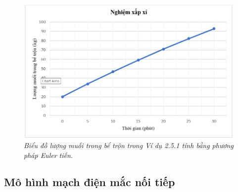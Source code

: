 \begin{figure}[H]
	\centering
	\includegraphics[scale=0.8]{Images/hinh_2_14.png}
	\caption[Biểu đồ lượng muối trong bể trộn trong Ví dụ 2.5.1
	tính bằng phương pháp Euler tiến.
	]{\itshape\fontsize{13pt}{0pt}\selectfont\centering Biểu đồ lượng muối trong bể trộn trong Ví dụ 2.5.1
		tính bằng phương pháp Euler tiến.}
	\label{hinh2.14}
\end{figure}
\subsection{Mô hình mạch điện mắc nối tiếp}
